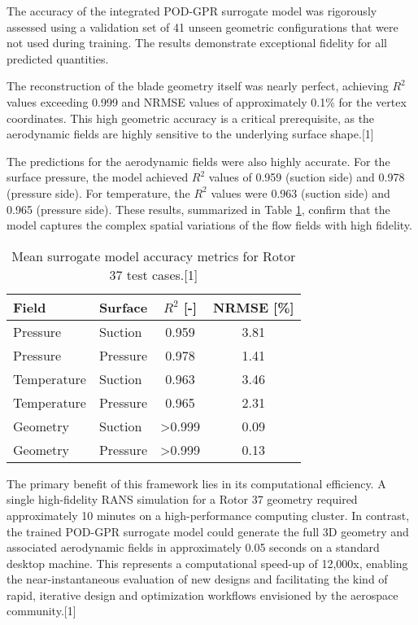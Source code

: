 \documentclass[12pt, a4paper]{report}
\begin{document}
The accuracy of the integrated POD-GPR surrogate model was rigorously assessed using a validation set of 41 unseen geometric configurations that were not used during training. The results demonstrate exceptional fidelity for all predicted quantities.

The reconstruction of the blade geometry itself was nearly perfect, achieving $R^2$ values exceeding 0.999 and NRMSE values of approximately 0.1\% for the vertex coordinates. This high geometric accuracy is a critical prerequisite, as the aerodynamic fields are highly sensitive to the underlying surface shape.[1]

The predictions for the aerodynamic fields were also highly accurate. For the surface pressure, the model achieved $R^2$ values of 0.959 (suction side) and 0.978 (pressure side). For temperature, the $R^2$ values were 0.963 (suction side) and 0.965 (pressure side). These results, summarized in Table \ref{tab:rotor37_accuracy}, confirm that the model captures the complex spatial variations of the flow fields with high fidelity.

\begin{table}[h!]
\centering
\caption{Mean surrogate model accuracy metrics for Rotor 37 test cases.[1]}
\label{tab:rotor37_accuracy}
\begin{tabular}{llcc}
\toprule
\textbf{Field} & \textbf{Surface} & \textbf{$R^2$ [-]} & \textbf{NRMSE [\%]} \\
\midrule
Pressure & Suction & 0.959 & 3.81 \\
Pressure & Pressure & 0.978 & 1.41 \\
Temperature & Suction & 0.963 & 3.46 \\
Temperature & Pressure & 0.965 & 2.31 \\
Geometry & Suction & >0.999 & 0.09 \\
Geometry & Pressure & >0.999 & 0.13 \\
\bottomrule
\end{tabular}
\end{table}

The primary benefit of this framework lies in its computational efficiency. A single high-fidelity RANS simulation for a Rotor 37 geometry required approximately 10 minutes on a high-performance computing cluster. In contrast, the trained POD-GPR surrogate model could generate the full 3D geometry and associated aerodynamic fields in approximately 0.05 seconds on a standard desktop machine. This represents a computational speed-up of 12,000x, enabling the near-instantaneous evaluation of new designs and facilitating the kind of rapid, iterative design and optimization workflows envisioned by the aerospace community.[1]
\end{document}
